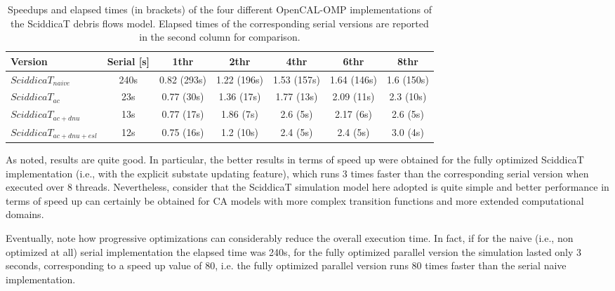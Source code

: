 \begin{table}
  \centering
  \footnotesize
  \begin{tabular}{l|c|c|c|c|c|c}
    \hline
    Version & Serial [s] & 1thr & 2thr & 4thr & 6thr & 8thr\\
    \hline
    \hline
    $SciddicaT_{naive}$     & 240s & 0.82 (293s) & 1.22 (196s) & 1.53 (157s) & 1.64 (146s) & 1.6 (150s)\\
    $SciddicaT_{ac}$       & 23s  & 0.77 (30s)  & 1.36 (17s)  & 1.77 (13s)  & 2.09 (11s)  & 2.3 (10s)\\
    $SciddicaT_{ac+dnu}$    & 13s  & 0.77 (17s)  & 1.86 (7s)   & 2.6  (5s)   & 2.17  (6s)  & 2.6 (5s)\\
    $SciddicaT_{ac+dnu+esl}$ & 12s  & 0.75 (16s)  & 1.2  (10s)  & 2.4  (5s)   & 2.4  (5s)   & 3.0 (4s)\\
    \hline
  \end{tabular}
  \caption{Speedups and elapsed times (in brackets) of the four
    different OpenCAL-OMP implementations of the SciddicaT debris
    flows model. Elapsed times of the corresponding serial versions
    are reported in the second column for comparison.}
  \label{tab:speedup}
\end{table}

As noted, results are quite good. In particular, the better
results in terms of speed up were obtained for the fully optimized
SciddicaT implementation (i.e., with the explicit substate updating
feature), which runs 3 times faster than the corresponding serial
version when executed over 8 threads. Nevertheless, consider that the
SciddicaT simulation model here adopted is quite simple and better
performance in terms of speed up can certainly be obtained for CA
models with more complex transition functions and more extended
computational domains.

Eventually, note how progressive optimizations can considerably
reduce the overall execution time. In fact, if for the naive (i.e., non
optimized at all) serial implementation the elapsed time was 240s, for
the fully optimized parallel version the simulation lasted only 3
seconds, corresponding to a speed up value of 80, i.e. the fully
optimized parallel version runs 80 times faster than the serial naive
implementation.

